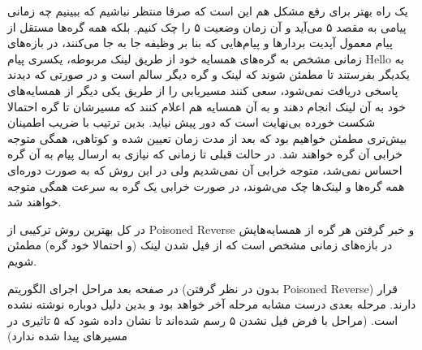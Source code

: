 \documentclass[12pt]{article}
\begin{document}
یک راه بهتر برای رفع مشکل هم این است که صرفا منتظر نباشیم که ببینیم چه زمانی پیامی به مقصد ۵ می‌آید و آن زمان وضعیت ۵ را چک کنیم. بلکه همه گره‌ها مستقل از پیام معمول آپدیت بردارها و پیام‌هایی که بنا بر وظیفه جا به جا می‌کنند، در بازه‌های زمانی مشخص به گره‌های همسایه خود از طریق لینک مربوطه، یکسری پیام Hello به یکدیگر بفرستند تا مطمئن شوند که لینک و گره دیگر سالم است و در صورتی که دیدند پاسخی دریافت نمی‌شود، سعی‌ کنند مسیریابی را از طریق یکی دیگر از همسایه‌های خود به آن لینک انجام دهند و به آن همسایه‌ هم اعلام کنند که مسیرشان تا گره احتمالا شکست خورده بی‌نهایت است که دور پیش نیاید. بدین ترتیب با ضریب اطمینان بیش‌تری مطمئن خواهیم بود که بعد از مدت زمان تعیین شده و کوتاهی، همگی متوجه خرابی آن گره خواهند شد. در حالت قبلی تا زمانی که نیازی به ارسال پیام به آن گره احساس نمی‌شد، متوجه خرابی آن نمی‌شدیم ولی در این روش که به صورت دوره‌ای همه گره‌ها و لینک‌ها چک می‌شوند، در صورت خرابی یک گره به سرعت همگی متوجه خواهند شد.

 
 در کل بهترین روش ترکیبی از Poisoned Reverse و خبر گرفتن هر گره از همسایه‌هایش در بازه‌های زمانی مشخص است که از فیل شدن لینک (و احتمالا خود گره) مطمئن شویم.
 
 
 در صفحه بعد مراحل اجرای الگوریتم (بدون در نظر گرفتن Poisoned Reverse) قرار دارند. مرحله بعدی درست مشابه مرحله آخر خواهد بود و بدین دلیل دوباره نوشته نشده است. (مراحل با فرض فیل نشدن ۵ رسم شده‌اند تا نشان داده شود که ۵ تاثیری در مسیرهای پیدا شده ندارد) 
 
\end{document}
